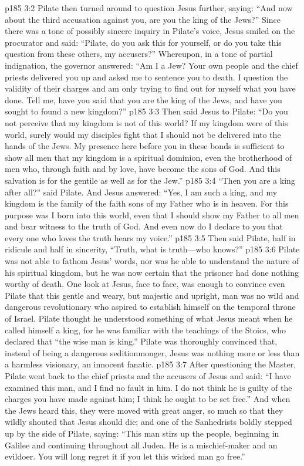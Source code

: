 \vs p185 3:2 Pilate then turned around to question Jesus further, saying: “And now about the third accusation against you, are you the king of the Jews?” Since there was a tone of possibly sincere inquiry in Pilate’s voice, Jesus smiled on the procurator and said: \textcolor{ubdarkred}{“Pilate, do you ask this for yourself, or do you take this question from these others, my accusers?”} Whereupon, in a tone of partial indignation, the governor answered: “Am I a Jew? Your own people and the chief priests delivered you up and asked me to sentence you to death. I question the validity of their charges and am only trying to find out for myself what you have done. Tell me, have you said that you are the king of the Jews, and have you sought to found a new kingdom?”\plusone
\vs p185 3:3 Then said Jesus to Pilate: \textcolor{ubdarkred}{“Do you not perceive that my kingdom is not of this world? If my kingdom were of this world, surely would my disciples fight that I should not be delivered into the hands of the Jews. My presence here before you in these bonds is sufficient to show all men that my kingdom is a spiritual dominion, even the brotherhood of men who, through faith and by love, have become the sons of God. And this salvation is for the gentile as well as for the Jew.”}
\vs p185 3:4 “Then you are a king after all?” said Pilate. And Jesus answered: \textcolor{ubdarkred}{“Yes, I am such a king, and my kingdom is the family of the faith sons of my Father who is in heaven. For this purpose was I born into this world, even that I should show my Father to all men and bear witness to the truth of God. And even now do I declare to you that every one who loves the truth hears my voice.”}
\vs p185 3:5 Then said Pilate, half in ridicule and half in sincerity, “Truth, what is truth---who knows?”
\vs p185 3:6 Pilate was not able to fathom Jesus’ words, nor was he able to understand the nature of his spiritual kingdom, but he was now certain that the prisoner had done nothing worthy of death. One look at Jesus, face to face, was enough to convince even Pilate that this gentle and weary, but majestic and upright, man was no wild and dangerous revolutionary who aspired to establish himself on the temporal throne of Israel. Pilate thought he understood something of what Jesus meant when he called himself a king, for he was familiar with the teachings of the Stoics, who declared that “the wise man is king.” Pilate was thoroughly convinced that, instead of being a dangerous seditionmonger, Jesus was nothing more or less than a harmless visionary, an innocent fanatic.
\vs p185 3:7 After questioning the Master, Pilate went back to the chief priests and the accusers of Jesus and said: “I have examined this man, and I find no fault in him. I do not think he is guilty of the charges you have made against him; I think he ought to be set free.” And when the Jews heard this, they were moved with great anger, so much so that they wildly shouted that Jesus should die; and one of the Sanhedrists boldly stepped up by the side of Pilate, saying: “This man stirs up the people, beginning in Galilee and continuing throughout all Judea. He is a mischief\hyp{}maker and an evildoer. You will long regret it if you let this wicked man go free.”
